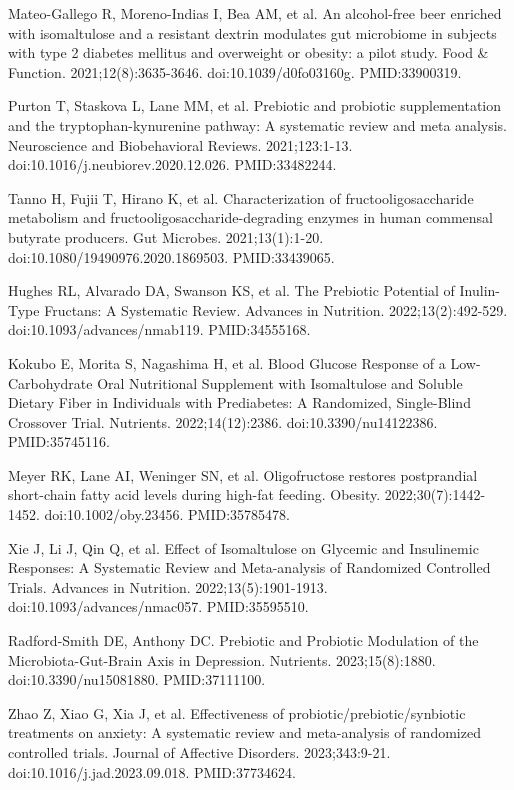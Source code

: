\documentclass[12pt,oneside]{book}
\newcommand{\reff}[2]{\par\hangindent=7mm\hangafter=1\noindent[#1]\hspace{2mm}#2\par}
\begin{document}
\reff{17}{Mateo-Gallego R, Moreno-Indias I, Bea AM, et al. An alcohol-free beer enriched with isomaltulose and a resistant dextrin modulates gut microbiome in subjects with type 2 diabetes mellitus and overweight or obesity: a pilot study. Food \& Function. 2021;12(8):3635-3646. doi:10.1039/d0fo03160g. PMID:33900319.}

\reff{18}{Purton T, Staskova L, Lane MM, et al. Prebiotic and probiotic supplementation and the tryptophan-kynurenine pathway: A systematic review and meta analysis. Neuroscience and Biobehavioral Reviews. 2021;123:1-13. doi:10.1016/j.neubiorev.2020.12.026. PMID:33482244.}

\reff{19}{Tanno H, Fujii T, Hirano K, et al. Characterization of fructooligosaccharide metabolism and fructooligosaccharide-degrading enzymes in human commensal butyrate producers. Gut Microbes. 2021;13(1):1-20. doi:10.1080/19490976.2020.1869503. PMID:33439065.}

\reff{20}{Hughes RL, Alvarado DA, Swanson KS, et al. The Prebiotic Potential of Inulin-Type Fructans: A Systematic Review. Advances in Nutrition. 2022;13(2):492-529. doi:10.1093/advances/nmab119. PMID:34555168.}

\reff{21}{Kokubo E, Morita S, Nagashima H, et al. Blood Glucose Response of a Low-Carbohydrate Oral Nutritional Supplement with Isomaltulose and Soluble Dietary Fiber in Individuals with Prediabetes: A Randomized, Single-Blind Crossover Trial. Nutrients. 2022;14(12):2386. doi:10.3390/nu14122386. PMID:35745116.}

\reff{22}{Meyer RK, Lane AI, Weninger SN, et al. Oligofructose restores postprandial short-chain fatty acid levels during high-fat feeding. Obesity. 2022;30(7):1442-1452. doi:10.1002/oby.23456. PMID:35785478.}

\reff{23}{Xie J, Li J, Qin Q, et al. Effect of Isomaltulose on Glycemic and Insulinemic Responses: A Systematic Review and Meta-analysis of Randomized Controlled Trials. Advances in Nutrition. 2022;13(5):1901-1913. doi:10.1093/advances/nmac057. PMID:35595510.}

\reff{24}{Radford-Smith DE, Anthony DC. Prebiotic and Probiotic Modulation of the Microbiota-Gut-Brain Axis in Depression. Nutrients. 2023;15(8):1880. doi:10.3390/nu15081880. PMID:37111100.}

\reff{25}{Zhao Z, Xiao G, Xia J, et al. Effectiveness of probiotic/prebiotic/synbiotic treatments on anxiety: A systematic review and meta-analysis of randomized controlled trials. Journal of Affective Disorders. 2023;343:9-21. doi:10.1016/j.jad.2023.09.018. PMID:37734624.}
\end{document}
